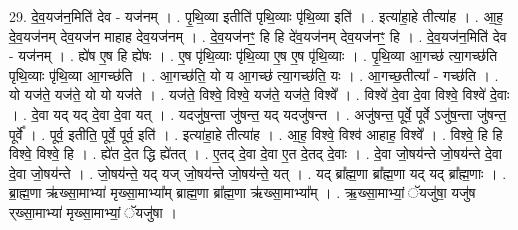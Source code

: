 \documentclass[17pt]{extarticle}
\begin{document}
29. दे॒व॒यज॑न॒मिति॑ देव - यज॑नम् । . पृ॒थि॒व्या इतीति॑ पृथि॒व्याः पृ॑थि॒व्या इति॑ । . इत्या॑हा॒हे तीत्या॑ह । . आ॒ह॒ दे॒व॒यज॑नम् देव॒यज॑न माहाह देव॒यज॑नम् । . दे॒व॒यज॑नꣳ॒॒ हि हि दे॑व॒यज॑नम् देव॒यज॑नꣳ॒॒ हि । . दे॒व॒यज॑न॒मिति॑ देव - यज॑नम् । . ह्ये॑ष ए॒ष हि ह्ये॑षः । . ए॒ष पृ॑थि॒व्याः पृ॑थि॒व्या ए॒ष ए॒ष पृ॑थि॒व्याः । . पृ॒थि॒व्या आ॒गच्छ॑ त्या॒गच्छ॑ति पृथि॒व्याः पृ॑थि॒व्या आ॒गच्छ॑ति । . आ॒गच्छ॑ति॒ यो य आ॒गच्छ॑ त्या॒गच्छ॑ति॒ यः । . आ॒गच्छ॒तीत्या᳚ - गच्छ॑ति । . यो यज॑ते॒ यज॑ते॒ यो यो यज॑ते । . यज॑ते॒ विश्वे॒ विश्वे॒ यज॑ते॒ यज॑ते॒ विश्वे᳚ । . विश्वे॑ दे॒वा दे॒वा विश्वे॒ विश्वे॑ दे॒वाः । . दे॒वा यद् यद् दे॒वा दे॒वा यत् । . यदजु॑ष॒न्ता जु॑षन्त॒ यद् यदजु॑षन्त । . अजु॑षन्त॒ पूर्वे॒ पूर्वे ऽजु॑ष॒न्ता जु॑षन्त॒ पूर्वे᳚ । . पूर्व॒ इतीति॒ पूर्वे॒ पूर्व॒ इति॑ । . इत्या॑हा॒हे तीत्या॑ह । . आ॒ह॒ विश्वे॒ विश्व॑ आहाह॒ विश्वे᳚ । . विश्वे॒ हि हि विश्वे॒ विश्वे॒ हि । . ह्ये॑त दे॒त द्धि ह्ये॑तत् । . ए॒तद् दे॒वा दे॒वा ए॒त दे॒तद् दे॒वाः । . दे॒वा जो॒षय॑न्ते जो॒षय॑न्ते दे॒वा दे॒वा जो॒षय॑न्ते । . जो॒षय॑न्ते॒ यद् यज् जो॒षय॑न्ते जो॒षय॑न्ते॒ यत् । . यद् ब्रा᳚ह्म॒णा ब्रा᳚ह्म॒णा यद् यद् ब्रा᳚ह्म॒णाः । . ब्रा॒ह्म॒णा ऋ॑ख्सा॒माभ्या॑ मृख्सा॒माभ्या᳚म् ब्राह्म॒णा ब्रा᳚ह्म॒णा ऋ॑ख्सा॒माभ्या᳚म् । . ऋ॒ख्सा॒माभ्यां॒ ॅयजु॑षा॒ यजु॑ष र्‌ख्सा॒माभ्या॑ मृख्सा॒माभ्यां॒ ॅयजु॑षा । \newline
\end{document}
